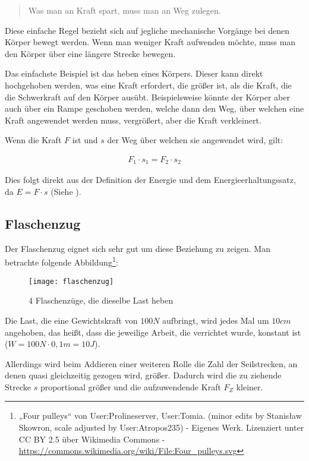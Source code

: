 \begin{quote}
	\glqq Was man an Kraft spart, muss man an Weg zulegen.\grqq
\end{quote}

\noindent Diese einfache Regel bezieht sich auf jegliche mechanische Vorgänge bei denen Körper bewegt werden. Wenn man weniger Kraft aufwenden möchte, muss man den Körper über eine längere Strecke bewegen. 

Das einfachste Beispiel ist das heben eines Körpers. Dieser kann direkt hochgehoben werden, was eine Kraft erfordert, die größer ist, als die Kraft, die die Schwerkraft auf den Körper ausübt. Beispielsweise könnte der Körper aber auch über ein Rampe geschoben werden, welche dann den Weg, über welchen eine Kraft angewendet werden muss, vergrößert, aber die Kraft verkleinert. 

Wenn die Kraft $F$ ist und $s$ der Weg über welchen sie angewendet wird, gilt:

\begin{align}
	F_{1} \cdot s_1 = F_{2} \cdot s_2
\end{align}

\noindent Dies folgt direkt aus der Definition der Energie und dem Energieerhaltungssatz, da $E=F \cdot s$ (Siehe ).

\subsection{Flaschenzug}

Der Flaschenzug eignet sich sehr gut um diese Beziehung zu zeigen. Man betrachte folgende Abbildung\footnote{„Four pulleys“ von User:Prolineserver, User:Tomia. (minor edits by Stanisław Skowron, scale adjusted by User:Atropos235) - Eigenes Werk. Lizenziert unter CC BY 2.5 über Wikimedia Commons - \url{https://commons.wikimedia.org/wiki/File:Four_pulleys.svg}}:

\begin{figure}[h!]
	\texttt{[image: flaschenzug]}
	\caption{4 Flaschenzüge, die dieselbe Last heben}
	\label{fig:flaschenzug}
\end{figure}

Die Last, die eine Gewichtskraft von $100N$ aufbringt, wird jedes Mal um $10cm$ angehoben, das heißt, dass die jeweilige Arbeit, die verrichtet wurde, konstant ist ($W = 100N \cdot 0,1m = 10J$).

Allerdings wird beim Addieren einer weiteren Rolle die Zahl der Seilstrecken, an denen quasi gleichzeitig gezogen wird, größer. Dadurch wird die zu ziehende Strecke $s$ proportional größer und die aufzuwendende Kraft $F_Z$ kleiner.

